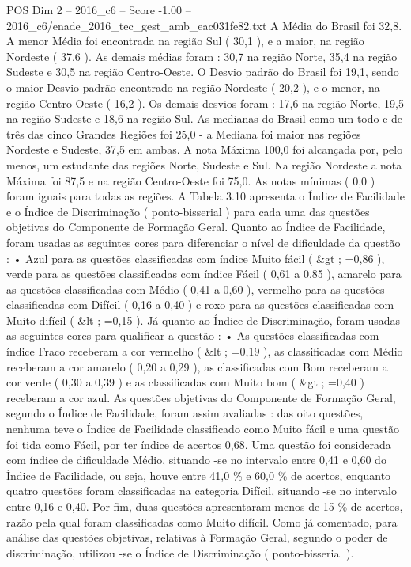 \begin{textsample}{POS Dim 2 – 2016\_c6 – Score -1.00 – 2016\_c6/enade\_2016\_tec\_gest\_amb\_eac031fe82.txt}
A Média do Brasil foi 32,8.
A menor Média foi encontrada na região Sul ( 30,1 ), e a maior, na região Nordeste ( 37,6 ).
As demais médias foram : 30,7 na região Norte, 35,4 na região Sudeste e 30,5 na região Centro-Oeste.
O Desvio padrão do Brasil foi 19,1, sendo o maior Desvio padrão encontrado na região Nordeste ( 20,2 ), e o menor, na região Centro-Oeste ( 16,2 ).
Os demais desvios foram : 17,6 na região Norte, 19,5 na região Sudeste e 18,6 na região Sul.
As medianas do Brasil como um todo e de três das cinco Grandes Regiões foi 25,0 - a Mediana foi maior nas regiões Nordeste e Sudeste, 37,5 em ambas.
A nota Máxima 100,0 foi alcançada por, pelo menos, um estudante das regiões Norte, Sudeste e Sul.
Na região Nordeste a nota Máxima foi 87,5 e na região Centro-Oeste foi 75,0.
As notas mínimas ( 0,0 ) foram iguais para todas as regiões.
A Tabela 3.10 apresenta o Índice de Facilidade e o Índice de Discriminação ( ponto-bisserial ) para cada uma das questões objetivas do Componente de Formação Geral.
Quanto ao Índice de Facilidade, foram usadas as seguintes cores para diferenciar o nível de dificuldade da questão : • Azul para as questões classificadas com índice Muito fácil ( \&gt ; =0,86 ), verde para as questões classificadas com índice Fácil ( 0,61 a 0,85 ), amarelo para as questões classificadas com Médio ( 0,41 a 0,60 ), vermelho para as questões classificadas com Difícil ( 0,16 a 0,40 ) e roxo para as questões classificadas com Muito difícil ( \&lt ; =0,15 ).
Já quanto ao Índice de Discriminação, foram usadas as seguintes cores para qualificar a questão : • As questões classificadas com índice Fraco receberam a cor vermelho ( \&lt ; =0,19 ), as classificadas com Médio receberam a cor amarelo ( 0,20 a 0,29 ), as classificadas com Bom receberam a cor verde ( 0,30 a 0,39 ) e as classificadas com Muito bom ( \&gt ; =0,40 ) receberam a cor azul.
As questões objetivas do Componente de Formação Geral, segundo o Índice de Facilidade, foram assim avaliadas : das oito questões, nenhuma teve o Índice de Facilidade classificado como Muito fácil e uma questão foi tida como Fácil, por ter índice de acertos 0,68.
Uma questão foi considerada com índice de dificuldade Médio, situando -se no intervalo entre 0,41 e 0,60 do Índice de Facilidade, ou seja, houve entre 41,0 \% e 60,0 \% de acertos, enquanto quatro questões foram classificadas na categoria Difícil, situando -se no intervalo entre 0,16 e 0,40.
Por fim, duas questões apresentaram menos de 15 \% de acertos, razão pela qual foram classificadas como Muito difícil.
Como já comentado, para análise das questões objetivas, relativas à Formação Geral, segundo o poder de discriminação, utilizou -se o Índice de Discriminação ( ponto-bisserial ).

\end{textsample}
